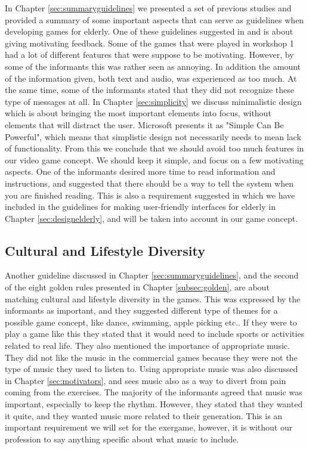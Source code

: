In Chapter \ref{sec:summaryguidelines} we presented a set of previous studies and provided a summary of some important aspects that can serve as guidelines when developing games for elderly. One of these guidelines suggested in \cite{Billis} and \cite{gerling1} is about giving motivating feedback. Some of the games that were played in workshop 1 had a lot of different features that were suppose to be motivating. However, by some of the informants this was rather seen as annoying.  In addition the amount of the information given, both text and audio, was experienced as too much. At the same time, some of the informants stated that they did not recognize these type of messages at all. In Chapter \ref{sec:simplicity} we discuss minimalistic design which is about bringing the most important elements into focus, without elements that will distract the user. Microsoft presents it as "Simple Can Be Powerful", which means that simplistic design not necessarily needs to mean lack of functionality. From this we conclude that we should avoid too much features in our video game concept. We should keep it simple, and focus on a few motivating aspects. One of the informants desired more time to read information and instructions, and suggested that there should be a way to tell the system when you are finished reading. This is also a requirement suggested in \cite{w3cTekst} which we have included in the guidelines for making user-friendly interfaces for elderly in Chapter \ref{sec:designelderly}, and will be taken into account in our game concept. 

\subsection{Cultural and Lifestyle Diversity}
Another guideline discussed in Chapter \ref{sec:summaryguidelines}, and the second of the eight golden rules presented in Chapter \ref{subsec:golden}, are about matching cultural and lifestyle diversity in the games. This was expressed by the informants as important, and they suggested different type of themes for a possible game concept, like dance, swimming, apple picking etc.. If they were to play a game like this they stated that it would need to include sports or activities related to real life. They also mentioned the importance of appropriate music. They did not like the music in the commercial games because they were not the type of music they used to listen to. Using appropriate music was also discussed in Chapter \ref{sec:motivators}, and \cite{schutzer} sees music also as a way to divert from pain coming from the exercises. The majority of the informants agreed that music was important, especially to keep the rhythm. However, they stated that they wanted it quite, and they wanted music more related to their generation. This is an important requirement we will set for the exergame, however, it is without our profession to say anything specific about what music to include. 

